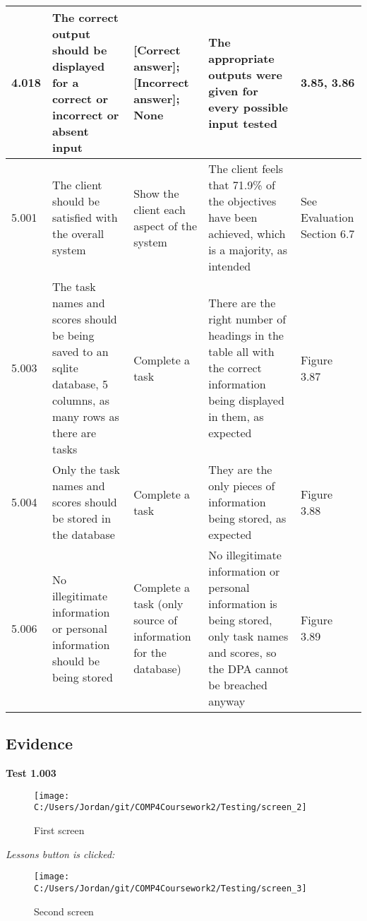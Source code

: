 \begin{landscape}
\begin{center}
\begin{longtable}{|p{2.5cm}|p{4cm}|p{4cm}|p{4.5cm}|p{3cm}|}
4.018 & The correct output should be displayed for a correct or incorrect or absent input & [Correct answer]; [Incorrect answer]; None & The appropriate outputs were given for every possible input tested & 3.85, 3.86 \\ \hline
5.001 & The client should be satisfied with the overall system & Show the client each aspect of the system & The client feels that 71.9\% of the objectives have been achieved, which is a majority, as intended & See Evaluation Section 6.7 \\ \hline
5.003 & The task names and scores should be being saved to an sqlite database, 5 columns, as many rows as there are tasks & Complete a task & There are the right number of headings in the table all with the correct information being displayed in them, as expected & Figure 3.87 \\ \hline
5.004 & Only the task names and scores should be stored in the database & Complete a task & They are the only pieces of information being stored, as expected & Figure 3.88 \\ \hline
5.006 & No illegitimate information or personal information should be being stored & Complete a task (only source of information for the database) & No illegitimate information or personal information is being stored, only task names and scores, so the DPA cannot be breached anyway & Figure 3.89 \\ \hline
\end{longtable}
\end{center}

\end{landscape}

\subsection{Evidence}

\textbf{Test 1.003}

\begin{figure}[H]
    \label{fig: First Screen}\caption{First screen}
    \texttt{[image: C:/Users/Jordan/git/COMP4Coursework2/Testing/screen\_2]}
\end{figure}

\textit{Lessons button is clicked: }

\begin{figure}[H]
    \label{fig: Second Screen}\caption{Second screen}
    \texttt{[image: C:/Users/Jordan/git/COMP4Coursework2/Testing/screen\_3]}
\end{figure}

